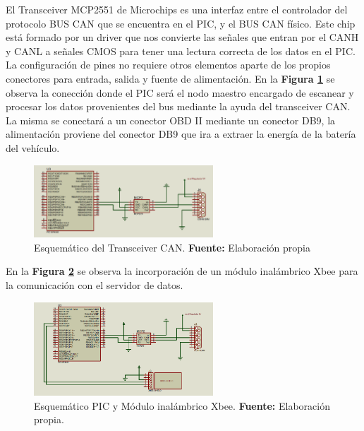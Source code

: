 


El Transceiver MCP2551 de Microchips es una interfaz entre el controlador del protocolo BUS CAN que se encuentra en el PIC, y el BUS CAN físico. Este chip está formado por un driver que nos convierte las señales que entran por el CANH  y CANL a señales CMOS para tener una lectura correcta de los datos en el PIC. La configuración de pines no requiere otros elementos aparte de los propios conectores para  entrada, salida y fuente de alimentación. En la \textbf{Figura \ref{Esch2}} se observa la conección donde el PIC será el nodo maestro encargado de escanear y procesar los datos provenientes del bus mediante la ayuda del transceiver CAN. La misma se conectará a un conector OBD II mediante un conector DB9, la alimentación proviene del conector DB9 que ira a extraer la energía de la batería del vehículo.


\begin{figure}[H]
	\centering
		\includegraphics[width=0.6\textwidth]{./Cap4imagen/pic_y_mcp_4.png}
	\caption[Esquemático del Transceiver CAN.]{Esquemático del Transceiver CAN.\textbf{ Fuente:} 
		Elaboración propia}
	\label{Esch2} %
\end{figure}




En la \textbf{Figura \ref{Esch3}} se observa la incorporación de un módulo inalámbrico Xbee para la comunicación con el servidor de datos. 


\begin{figure}[H]
	\centering
		\includegraphics[width=0.6\textwidth]{./Cap4imagen/xbee_4.png}
	\caption[Esquemático PIC y Módulo inalámbrico Xbee.]{Esquemático PIC y Módulo inalámbrico Xbee.\textbf{ Fuente:} Elaboración propia.}
	\label{Esch3} %
\end{figure}

